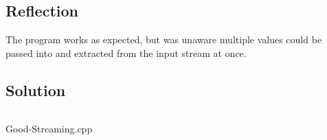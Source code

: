 \documentclass[Lab-B.tex]{subfiles}
\begin{document}
        \subsection{Reflection}
            The program works as expected, but was unaware multiple values could be passed
            into and extracted from the input stream at once.
        
        \subsection{Solution}
            \begin{listing}[H]
                \inputminted{cpp}{../Tasks/01-Good-Streaming/Good-Streaming.cpp}%
                \caption{Good-Streaming.cpp}
            \end{listing}
\end{document}

